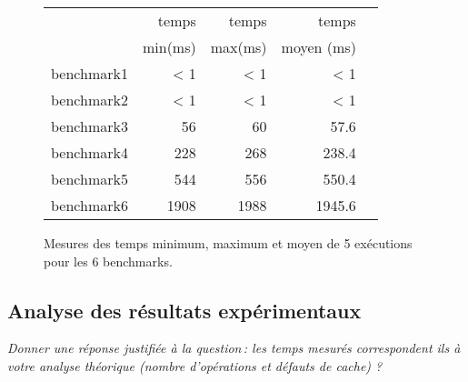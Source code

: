 \documentclass[a4paper, 10pt, french]{article}
\begin{document}
    \begin{figure}[h]
      \begin{center}
        \begin{tabular}{|l||r||r|r|r||}
          \hline
          \hline
            & temps     & temps   & temps     \\
            & min(ms)  & max(ms)  & moyen (ms)\\
          \hline
          \hline
            benchmark1 & < 1 & < 1 & < 1 \\
          \hline
            benchmark2 & < 1 & < 1 & < 1 \\
          \hline
            benchmark3 & 56 & 60 & 57.6 \\
          \hline
            benchmark4 & 228 & 268 & 238.4 \\
          \hline
            benchmark5 & 544 & 556 & 550.4 \\
          \hline
            benchmark6 & 1908 & 1988 & 1945.6 \\
          \hline
          \hline
        \end{tabular}
        \caption{Mesures des temps minimum, maximum et moyen de 5 exécutions pour les 6 benchmarks.}
        \label{table-temps}
      \end{center}
    \end{figure}

\subsection{Analyse des résultats expérimentaux}
{\em Donner  une réponse justifiée  à la question\,: 
              les  temps mesurés correspondent ils  à votre analyse théorique (nombre d’opérations et défauts de cache) ?
}
\end{document}
